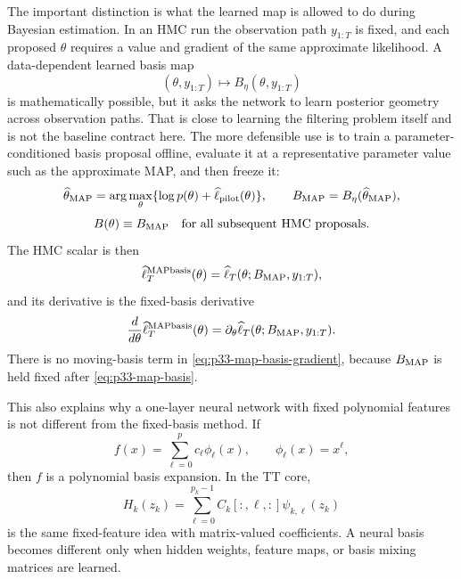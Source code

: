 \documentclass[11pt]{article}
\numberwithin{equation}{section}
\begin{document}
The important distinction is what the learned map is allowed to do during
Bayesian estimation.  In an HMC run the observation path \(y_{1:T}\) is fixed,
and each proposed \(\theta\) requires a value and gradient of the same
approximate likelihood.  A data-dependent learned basis map
\begin{equation}
    (\theta,y_{1:T})\mapsto B_\eta(\theta,y_{1:T})
    \label{eq:p33-data-dependent-basis-map}
\end{equation}
is mathematically possible, but it asks the network to learn posterior
geometry across observation paths.  That is close to learning the filtering
problem itself and is not the baseline contract here.  The more defensible
use is to train a parameter-conditioned basis proposal offline, evaluate it at
a representative parameter value such as the approximate MAP, and then freeze
it:
\begin{equation}
    \widehat\theta_{\rm MAP}
    =
    \arg\max_\theta\{\log p(\theta)+\widehat\ell_{\rm pilot}(\theta)\},
    \qquad
    B_{\rm MAP}=B_\eta(\widehat\theta_{\rm MAP}),
    \label{eq:p33-map-basis}
\end{equation}
\begin{equation}
    B(\theta)\equiv B_{\rm MAP}
    \quad\text{for all subsequent HMC proposals.}
    \label{eq:p33-map-basis-frozen}
\end{equation}
The HMC scalar is then
\begin{equation}
    \widehat\ell_T^{\rm MAPbasis}(\theta)
    =
    \widehat\ell_T(\theta;B_{\rm MAP},y_{1:T}),
    \label{eq:p33-map-basis-scalar}
\end{equation}
and its derivative is the fixed-basis derivative
\begin{equation}
    \frac{d}{d\theta}\widehat\ell_T^{\rm MAPbasis}(\theta)
    =
    \partial_\theta \widehat\ell_T(\theta;B_{\rm MAP},y_{1:T}).
    \label{eq:p33-map-basis-gradient}
\end{equation}
There is no moving-basis term in \eqref{eq:p33-map-basis-gradient}, because
\(B_{\rm MAP}\) is held fixed after \eqref{eq:p33-map-basis}.

This also explains why a one-layer neural network with fixed polynomial
features is not different from the fixed-basis method.  If
\begin{equation}
    f(x)=\sum_{\ell=0}^{p}c_\ell\phi_\ell(x),
    \qquad
    \phi_\ell(x)=x^\ell,
    \label{eq:p33-fixed-feature-network}
\end{equation}
then \(f\) is a polynomial basis expansion.  In the TT core,
\begin{equation}
    H_k(z_k)=
    \sum_{\ell=0}^{p_k-1}
    C_k[:,\ell,:]\psi_{k,\ell}(z_k)
    \label{eq:p33-fixed-feature-tt-core}
\end{equation}
is the same fixed-feature idea with matrix-valued coefficients.  A neural
basis becomes different only when hidden weights, feature maps, or basis
mixing matrices are learned.
\end{document}
